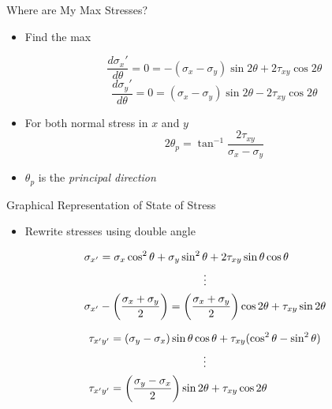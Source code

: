 \documentclass[10pt, svgnames]{beamer}
\begin{document}
\begin{frame}[label={sec:orgfe15675}]{Where are My Max Stresses?}
\begin{itemize}
\item Find the max

\[\dfrac{d \sigma_x'}{d\theta} = 0 = - \left( \sigma_x - \sigma_y \right) \sin 2\theta + 2\tau_{xy} \cos 2\theta\]
\[\dfrac{d \sigma_y'}{d\theta} = 0 = \left( \sigma_x - \sigma_y \right) \sin 2\theta - 2\tau_{xy} \cos 2\theta\]

\item For both normal stress in \(x\) and \(y\)
\[2 \theta_p = \tan^{-1} \dfrac{2\tau_{xy}}{\sigma_x - \sigma_y}\]

\item \(\theta_p\) is the \emph{principal direction}
\end{itemize}
\end{frame}

\begin{frame}[label={sec:orgde8b37f}]{Graphical Representation of State of Stress}
\begin{itemize}
\item Rewrite stresses using double angle
\end{itemize}

\begin{gather*}
  \sigma_{x'} = \sigma_x\cos^2\theta  + \sigma_y\sin^2\theta  + 2\tau_{xy}\sin \theta \cos \theta  \hfill \\
  \vdots \\
  \sigma_{x'} - \left( \dfrac{\sigma_x + \sigma_y}{2} \right) = \left( \dfrac{\sigma_x + \sigma_y}{2} \right)\cos 2\theta  + {\tau_{xy}}\sin 2\theta  \hfill
\end{gather*}

\begin{gather*}
  \tau_{x'y'} = (\sigma_y - \sigma_x)\sin \theta \cos \theta  + \tau_{xy}(\cos^2\theta  - \sin^2\theta ) \\
  \vdots \\
  \tau_{x'y'} = \left( \dfrac{\sigma_y - \sigma_x}{2} \right)\sin 2\theta  + \tau _{xy}\cos 2\theta \hfill
\end{gather*}
\end{frame}
\end{document}
